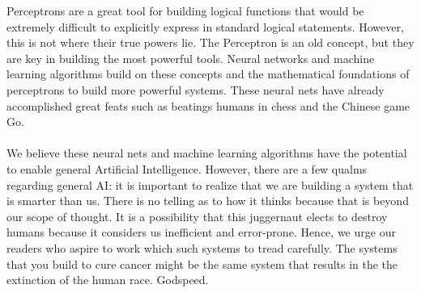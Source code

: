 Perceptrons are a great tool for building logical functions that would be extremely difficult to explicitly express in standard logical statements. However, this is not where their true powers lie. The Perceptron is an old concept, but they are key in building the most powerful tools. Neural networks and machine learning algorithms build on these concepts and the mathematical foundations of perceptrons to build more powerful systems. These neural nets have already accomplished great feats such as beatings humans in chess and the Chinese game Go. \\ \\
We believe these neural nets and machine learning algorithms have the potential to enable general Artificial Intelligence. However, there are a few qualms regarding general AI: it is important to realize that we are building a system that is smarter than us. There is no telling as to how it thinks because that is beyond our scope of thought. It is a possibility that this juggernaut elects to destroy humans because it considers us inefficient and error-prone. Hence, we urge our readers who aspire to work which such systems to tread carefully. The systems that you build to cure cancer might be the same system that results in the the extinction of the human race. Godspeed.